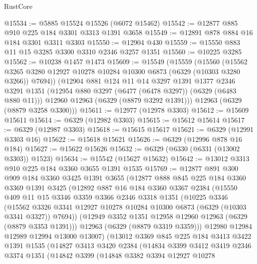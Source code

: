\begin{lexlean}{RustCore}
\begin{coremodule}
@15534 := @5885 @15524 @15526 (@6072 @15462)
@15542 := @12877 @885 @910 @225 @184 @3301 @3313 @1391 @3658
@15549 := @12891 @878 @884 @16 @184 @3301 @3311 @3303
@15550 := @12904 @430
@15559 := @15550 @883 @11 @15 @3285 @3300 @3310 @2346 @3257 @1351
@15560 := @10225 @3285
@15562 := @10238 @1457 @1473
@15609 := @15549
    (@15559
      (@15560
        (@15562 @3265 @3280 @12927 @10278 @10284 @10300 @6873 (@6329 (@10303 @3280 @3266)) @7694))
      (@12904
        @881
        @124
        @11
        @14
        @3297
        @1391
        @1377
        @2346
        @3291
        @1351
        (@12954 @880 @3297 (@6477 (@6478 @3297)) (@6329 (@6483 @880 @11)))
        @12960
        @12963
        (@6329 (@8879 @3292 @1391)))
      @12963
      (@6329 (@8879 @3258 @3300)))
@15611 := @12977 (@12978 @3303)
@15612 := @15609 @15611
@15614 := @6329 (@12982 @3303)
@15615 := @15612 @15614
@15617 := @6329 (@12987 @3303)
@15618 := @15615 @15617
@15621 := @6329 (@12991 @3303 @16)
@15622 := @15618 @15621
@15626 := @6329 (@12996 @878 @16 @184)
@15627 := @15622 @15626
@15632 := @6329 (@6330 (@6331 (@13002 @3303)) @1523)
@15634 := @15542 (@15627 @15632)
@15642 := @13012 @3313 @910 @225 @184 @3360 @3655 @1391 @1535
@15769 := @12877
    @891
    @300
    @909
    @184
    @3360
    @3425
    @1391
    @3655
    (@12877
      @888
      @845
      @225
      @184
      @3360
      @3369
      @1391
      @3425
      (@12892
        @887
        @16
        @184
        @3360
        @3367
        @2384
        (@15550
          @409
          @11
          @15
          @3346
          @3359
          @3366
          @2346
          @3318
          @1351
          (@10225
            @3346
            (@15562
              @3326
              @3341
              @12927
              @10278
              @10284
              @10300
              @6873
              (@6329 (@10303 @3341 @3327))
              @7694))
          (@12949 @3352 @1351 @12958 @12960 @12963 (@6329 (@8879 @3353 @1391)))
          @12963
          (@6329 (@8879 @3319 @3359)))
        @12980
        @12984
        @12989
        @12994
        @13000
        @13007)
      (@13012
        @3369
        @845
        @225
        @184
        @3413
        @3422
        @1391
        @1535
        (@14827
          @3413
          @3420
          @2384
          (@14834
            @3399
            @3412
            @3419
            @2346
            @3374
            @1351
            (@14842
              @3399
              (@14848
                @3382
                @3394
                @12927
                @10278

\end{coremodule}
\end{lexlean}
